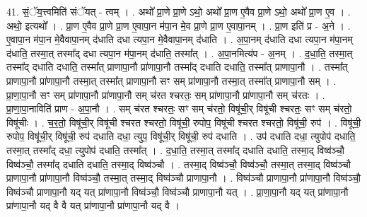 \documentclass[17pt]{extarticle}
\begin{document}
41. सं॒ॅय॒त्त्वमिति॑ संॅयत् - त्वम् । . अथो᳚ प्रा॒णे प्रा॒णे ऽथो॒ अथो᳚ प्रा॒ण ए॒वैव प्रा॒णे ऽथो॒ अथो᳚ प्रा॒ण ए॒व । . अथो॒ इत्यथो᳚ । . प्रा॒ण ए॒वैव प्रा॒णे प्रा॒ण ए॒वापा॒न म॑पा॒न मे॒व प्रा॒णे प्रा॒ण ए॒वापा॒नम् । . प्रा॒ण इति॑ प्र - अ॒ने । . ए॒वापा॒न म॑पा॒न मे॒वैवापा॒नम् द॑धाति दधा त्यपा॒न मे॒वैवापा॒नम् द॑धाति । . अ॒पा॒नम् द॑धाति दधा त्यपा॒न म॑पा॒नम् द॑धाति॒ तस्मा॒त् तस्मा᳚द् दधा त्यपा॒न म॑पा॒नम् द॑धाति॒ तस्मा᳚त् । . अ॒पा॒नमित्य॑प - अ॒नम् । . द॒धा॒ति॒ तस्मा॒त् तस्मा᳚द् दधाति दधाति॒ तस्मा᳚त् प्राणापा॒नौ प्रा॑णापा॒नौ तस्मा᳚द् दधाति दधाति॒ तस्मा᳚त् प्राणापा॒नौ । . तस्मा᳚त् प्राणापा॒नौ प्रा॑णापा॒नौ तस्मा॒त् तस्मा᳚त् प्राणापा॒नौ सꣳ सम् प्रा॑णापा॒नौ तस्मा॒त् तस्मा᳚त् प्राणापा॒नौ सम् । . प्रा॒णा॒पा॒नौ सꣳ सम् प्रा॑णापा॒नौ प्रा॑णापा॒नौ सम् च॑रत श्चरतः॒ सम् प्रा॑णापा॒नौ प्रा॑णापा॒नौ सम् च॑रतः । . प्रा॒णा॒पा॒नाविति॑ प्राण - अ॒पा॒नौ । . सम् च॑रत श्चरतः॒ सꣳ सम् च॑रतो॒ विषू॑ची॒र् विषू॑ची श्चरतः॒ सꣳ सम् च॑रतो॒ विषू॑चीः । . च॒र॒तो॒ विषू॑ची॒र् विषू॑ची श्चरत श्चरतो॒ विषू॑ची॒ रुपोप॒ विषू॑ची श्चरत श्चरतो॒ विषू॑ची॒ रुप॑ । . विषू॑ची॒ रुपोप॒ विषू॑ची॒र् विषू॑ची॒ रुप॑ दधाति दधा॒ त्युप॒ विषू॑ची॒र् विषू॑ची॒ रुप॑ दधाति । . उप॑ दधाति दधा॒ त्युपोप॑ दधाति॒ तस्मा॒त् तस्मा᳚द् दधा॒ त्युपोप॑ दधाति॒ तस्मा᳚त् । . द॒धा॒ति॒ तस्मा॒त् तस्मा᳚द् दधाति दधाति॒ तस्मा॒द् विष्व॑ञ्चौ॒ विष्व॑ञ्चौ॒ तस्मा᳚द् दधाति दधाति॒ तस्मा॒द् विष्व॑ञ्चौ । . तस्मा॒द् विष्व॑ञ्चौ॒ विष्व॑ञ्चौ॒ तस्मा॒त् तस्मा॒द् विष्व॑ञ्चौ प्राणापा॒नौ प्रा॑णापा॒नौ विष्व॑ञ्चौ॒ तस्मा॒त् तस्मा॒द् विष्व॑ञ्चौ प्राणापा॒नौ । . विष्व॑ञ्चौ प्राणापा॒नौ प्रा॑णापा॒नौ विष्व॑ञ्चौ॒ विष्व॑ञ्चौ प्राणापा॒नौ यद् यत् प्रा॑णापा॒नौ विष्व॑ञ्चौ॒ विष्व॑ञ्चौ प्राणापा॒नौ यत् । . प्रा॒णा॒पा॒नौ यद् यत् प्रा॑णापा॒नौ प्रा॑णापा॒नौ यद् वै वै यत् प्रा॑णापा॒नौ प्रा॑णापा॒नौ यद् वै । \newline
\end{document}
